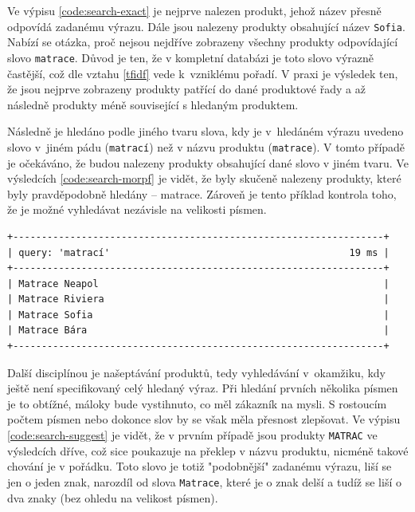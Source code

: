 \documentclass[FM,DP]{tulthesis}
\newenvironment{code}
    {\filbreak\captionsetup{type=listing}}{\filbreak}
\begin{document}
Ve výpisu \ref{code:search-exact} je nejprve nalezen produkt, jehož název přesně odpovídá zadanému 
výrazu. Dále jsou nalezeny produkty obsahující název \verb|Sofia|. Nabízí se otázka, proč nejsou
nejdříve zobrazeny všechny produkty odpovídající slovo \verb|matrace|. Důvod je ten, že v kompletní
databázi je toto slovo výrazně častější, což dle vztahu \ref{tfidf} vede k~vzniklému pořadí.
V praxi je výsledek ten, že jsou nejprve zobrazeny produkty patřící do dané produktové řady
a až následně produkty méně související s hledaným produktem.

Následně je hledáno podle jiného tvaru slova, kdy je v~hledáném výrazu uvedeno slovo v~jiném 
pádu (\verb|matrací|) než v názvu produktu (\verb|matrace|). V tomto případě je očekáváno, že budou 
nalezeny produkty obsahující dané slovo v jiném tvaru. Ve výsledcích \ref{code:search-morpf} je vidět, 
že byly skučeně nalezeny produkty, které byly pravděpodobně hledány -- matrace. Zároveň je tento 
příklad kontrola toho, že je možné vyhledávat nezávisle na velikosti písmen.

\begin{code}
\captionsetup{singlelinecheck=false,justification=raggedright}
\label{code:search-morpf}
\begin{verbatim}
+-----------------------------------------------------------------+
| query: 'matrací'                                          19 ms |
+-----------------------------------------------------------------+
| Matrace Neapol                                                  |
| Matrace Riviera                                                 |
| Matrace Sofia                                                   |
| Matrace Bára                                                    |
+-----------------------------------------------------------------+
\end{verbatim}
\end{code}

Další disciplínou je našeptávání produktů, tedy vyhledávání v~okamžiku, kdy ještě není specifikovaný
celý hledaný výraz. Při hledání prvních několika písmen je to obtížné, máloky bude vystihnuto, co
měl zákazník na mysli. S rostoucím počtem písmen nebo dokonce slov by se však měla přesnost zlepšovat.
Ve výpisu \ref{code:search-suggest} je vidět, že v prvním případě jsou produkty \verb|MATRAC| ve výsledcích
dříve, což sice poukazuje na překlep v názvu produktu, nicméně takové chování je v pořádku.
Toto slovo je totiž "podobnější" zadanému výrazu, liší se jen o jeden znak, narozdíl od slova
\verb|Matrace|, které je o znak delší a tudíž se liší o dva znaky (bez ohledu na velikost písmen).
\end{document}
